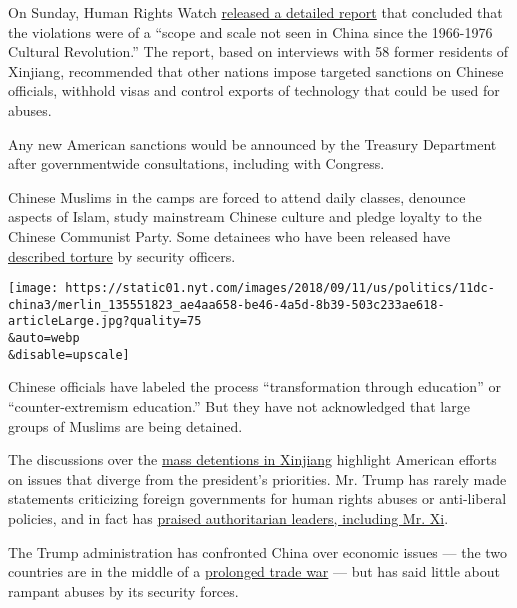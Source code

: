On Sunday, Human Rights Watch
\href{https://www.hrw.org/report/2018/09/09/eradicating-ideological-viruses/chinas-campaign-repression-against-xinjiangs}{released
a detailed report} that concluded that the violations were of a ``scope
and scale not seen in China since the 1966-1976 Cultural Revolution.''
The report, based on interviews with 58 former residents of Xinjiang,
recommended that other nations impose targeted sanctions on Chinese
officials, withhold visas and control exports of technology that could
be used for abuses.

Any new American sanctions would be announced by the Treasury Department
after governmentwide consultations, including with Congress.

Chinese Muslims in the camps are forced to attend daily classes,
denounce aspects of Islam, study mainstream Chinese culture and pledge
loyalty to the Chinese Communist Party. Some detainees who have been
released have
\href{https://www.washingtonpost.com/world/asia_pacific/former-inmates-of-chinas-muslim-re-education-camps-tell-of-brainwashing-torture/2018/05/16/32b330e8-5850-11e8-8b92-45fdd7aaef3c_story.html?utm_term=.c44ce1a08d6a}{described
torture} by security officers.

\texttt{[image: https://static01.nyt.com/images/2018/09/11/us/politics/11dc-china3/merlin\_135551823\_ae4aa658-be46-4a5d-8b39-503c233ae618-articleLarge.jpg?quality=75\\\&auto=webp\\\&disable=upscale]}

Chinese officials have labeled the process ``transformation through
education'' or ``counter-extremism education.'' But they have not
acknowledged that large groups of Muslims are being detained.

The discussions over the
\href{https://supchina.com/2018/08/22/xinjiang-explainer-chinas-reeducation-camps-for-a-million-muslims/}{mass
detentions in Xinjiang} highlight American efforts on issues that
diverge from the president's priorities. Mr. Trump has rarely made
statements criticizing foreign governments for human rights abuses or
anti-liberal policies, and in fact has
\href{https://www.washingtonpost.com/news/worldviews/wp/2018/03/04/in-a-jokey-speech-trump-praised-chinas-xi-for-ditching-term-limits-saying-maybe-well-give-that-a-shot-some-day/?utm_term=.2a55d1e1905a}{praised
authoritarian leaders, including Mr. Xi}.

The Trump administration has confronted China over economic issues ---
the two countries are in the middle of a
\href{https://www.nytimes.com/2018/09/07/business/trump-china-trade-war-tariffs.html}{prolonged
trade war} --- but has said little about rampant abuses by its security
forces.

